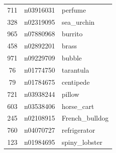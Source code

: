 \begin{table}
\begin{tabular}{cll}
711 & n03916031 & perfume \\
328 & n02319095 & sea_urchin \\
965 & n07880968 & burrito \\
458 & n02892201 & brass \\
971 & n09229709 & bubble \\
76 & n01774750 & tarantula \\
79 & n01784675 & centipede \\
721 & n03938244 & pillow \\
603 & n03538406 & horse_cart \\
245 & n02108915 & French_bulldog \\
760 & n04070727 & refrigerator \\
123 & n01984695 & spiny_lobster \\
\bottomrule
\end{tabular}
\end{table}

